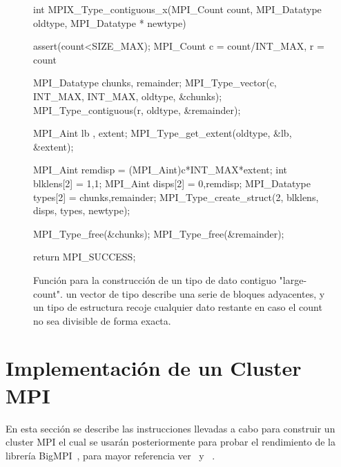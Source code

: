 \documentclass[conference]{IEEEtran}
\begin{document}
\begin{figure}
\begin{code}
int MPIX_Type_contiguous_x(MPI_Count count,
                           MPI_Datatype oldtype,
                           MPI_Datatype * newtype)
{
    assert(count<SIZE_MAX);
    MPI_Count c = count/INT_MAX, r = count%

    MPI_Datatype chunks, remainder;
    MPI_Type_vector(c, INT_MAX, INT_MAX, oldtype, &chunks);
    MPI_Type_contiguous(r, oldtype, &remainder);

    MPI_Aint lb , extent;
    MPI_Type_get_extent(oldtype, &lb, &extent);

    MPI_Aint remdisp          = (MPI_Aint)c*INT_MAX*extent;
    int blklens[2]            = {1,1};
    MPI_Aint disps[2]         = {0,remdisp};
    MPI_Datatype types[2]     = {chunks,remainder};
    MPI_Type_create_struct(2, blklens, disps, types,
             newtype);

    MPI_Type_free(&chunks);
    MPI_Type_free(&remainder);

    return MPI_SUCCESS;
}
\end{code}
\caption{Función para la construcción de un tipo de dato contiguo "large-count".
un vector de tipo describe una serie de bloques adyacentes, y un tipo de estructura
recoje cualquier dato restante en caso el count no sea divisible de forma exacta.}
\label{code:type_contig_x}
\end{figure}

\section{Implementación de un Cluster MPI}

En esta sección se describe las instrucciones llevadas a cabo para construir un cluster MPI
el cual se usarán posteriormente para probar el rendimiento de la librería
BigMPI~\cite{big-mpi-library}, para mayor referencia ver~\cite{mpi-cluster-lan-raspberry} y
~\cite{mpi-cluster-lan}.
\end{document}
